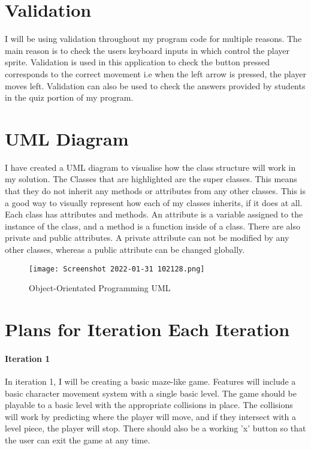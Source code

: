 \documentclass[12pt]{report}
\begin{document}
\section{Validation}
I will be using validation throughout my program code for multiple reasons. The main reason is to check the users keyboard inputs in which control the player sprite. Validation is used in this application to check the button pressed corresponds to the correct movement i.e when the left arrow is pressed, the player moves left. Validation can also be used to check the answers provided by students in the quiz portion of my program.  

\pagebreak

\section{UML Diagram}
I have created a UML diagram to visualise how the class structure will work in my solution. The Classes that are highlighted are the super classes. This means that they do not inherit any methods or attributes from any other classes. This is a good way to visually represent how each of my classes inherits, if it does at all. Each class has attributes and methods. An attribute is a variable assigned to the instance of the class, and a method is a function inside of a class. There are also private and public attributes. A private attribute can not be modified by any other classes, whereas a public attribute can be changed globally. 

\begin{figure}[h]
    \centering
    \texttt{[image: Screenshot 2022-01-31 102128.png]}
    \caption{Object-Orientated Programming UML}
    \label{UML}
\end{figure}

\pagebreak

\section{Plans for Iteration Each Iteration}
\paragraph{Iteration 1}
In iteration 1, I will be creating a basic maze-like game. Features will include a basic character movement system with a single basic level. The game should be playable to a basic level with the appropriate collisions in place. The collisions will work by predicting where the player will move, and if they intersect with a level piece, the player will stop. There should also be a working 'x' button so that the user can exit the game at any time. 
\end{document}
